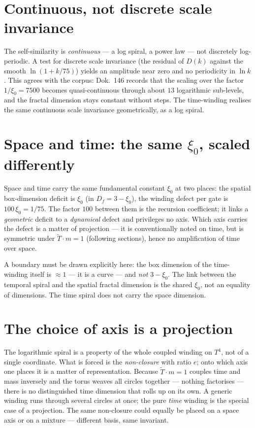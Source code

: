 \section{Continuous, not discrete scale invariance}
The self-similarity is \emph{continuous} --- a log spiral, a power law --- not discretely
log-periodic. A test for discrete scale invariance (the residual of $D(k)$ against the smooth
$\ln(1+k/75)$) yields an amplitude near zero and no periodicity in $\ln k$. This agrees with the
corpus: Dok.~146 records that the scaling over the factor $1/\xi_0=7500$ becomes
quasi-continuous through about $13$ logarithmic sub-levels, and the fractal dimension stays
constant without steps. The time-winding realises the same continuous scale invariance
geometrically, as a log spiral.

\section{Space and time: the same $\xi_0$, scaled differently}
Space and time carry the same fundamental constant $\xi_0$ at two places: the spatial
box-dimension deficit is $\xi_0$ (in $D_f=3-\xi_0$), the winding defect per gate is
$100\,\xi_0=1/75$. The factor $100$ between them is the recursion coefficient; it links a
\emph{geometric} deficit to a \emph{dynamical} defect and privileges no axis. Which axis carries
the defect is a matter of projection --- it is conventionally noted on time, but is symmetric
under $\tilde T\cdot m=1$ (following sections), hence no amplification of time over space.

A boundary must be drawn explicitly here: the box dimension of the time-winding itself is
$\approx 1$ --- it is a curve --- and \emph{not} $3-\xi_0$. The link between the temporal spiral
and the spatial fractal dimension is the shared $\xi_0$, not an equality of dimensions. The time
spiral does not carry the space dimension.

\section{The choice of axis is a projection}
The logarithmic spiral is a property of the whole coupled winding on $T^4$, not of a single
coordinate. What is forced is the \emph{non-closure} with ratio $e$; onto which axis one places
it is a matter of representation. Because $\tilde T\cdot m=1$ couples time and mass inversely and
the torus weaves all circles together --- nothing factorises --- there is no distinguished time
dimension that rolls up on its own. A generic winding runs through several circles at once; the
pure \emph{time} winding is the special case of a projection. The same non-closure could equally
be placed on a space axis or on a mixture --- different basis, same invariant.

